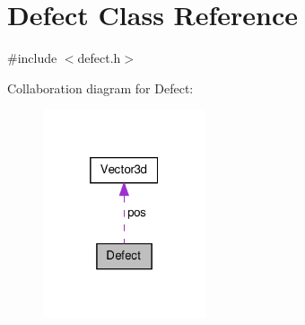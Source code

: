 \hypertarget{classDefect}{\section{\-Defect \-Class \-Reference}
\label{d5/d4f/classDefect}
}


{\ttfamily \#include $<$defect.\-h$>$}



\-Collaboration diagram for \-Defect\-:
\nopagebreak
\begin{figure}[H]
\begin{center}
\leavevmode
\includegraphics[width=136pt]{d7/d09/classDefect__coll__graph}
\end{center}
\end{figure}
